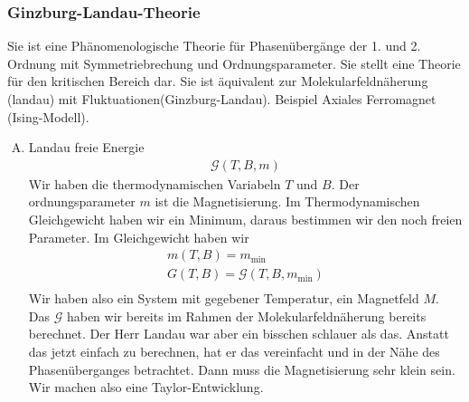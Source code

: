 \begin{description}
\subsubsection*{Ginzburg-Landau-Theorie}
Sie ist eine Phänomenologische Theorie für Phasenübergänge der 1. und 2. Ordnung
mit Symmetriebrechung und Ordnungsparameter. Sie stellt eine Theorie für den kritischen Bereich dar.
Sie ist äquivalent zur Molekularfeldnäherung (landau) mit Fluktuationen(Ginzburg-Landau).
Beispiel Axiales Ferromagnet (Ising-Modell).
\begin{enumerate}[A)]
  \item Landau freie Energie
    \begin{align*}
      \mathcal{G}(T, B, m)
    \end{align*}
    Wir haben die thermodynamischen Variabeln $T$ und $B$. Der ordnungsparameter
    $m$ ist die Magnetisierung. Im Thermodynamischen Gleichgewicht haben wir
    ein Minimum, daraus bestimmen wir den noch freien Parameter. Im Gleichgewicht
    haben wir
    \begin{align*}
      m(T, B) = m_\text{min} \\
      G(T, B) = \mathcal{G}(T, B, m_\text{min}) \\
    \end{align*}
    Wir haben also ein System mit gegebener Temperatur, ein Magnetfeld $M$.
    Das $\mathcal{G}$ haben wir bereits im Rahmen der Molekularfeldnäherung
    bereits berechnet. Der Herr Landau war aber ein bisschen schlauer als das.
    Anstatt das jetzt einfach zu berechnen, hat er das vereinfacht und in
    der Nähe des Phasenüberganges betrachtet. Dann muss die Magnetisierung
    sehr klein sein. Wir machen also eine Taylor-Entwicklung.


\end{enumerate}
\end{description}
